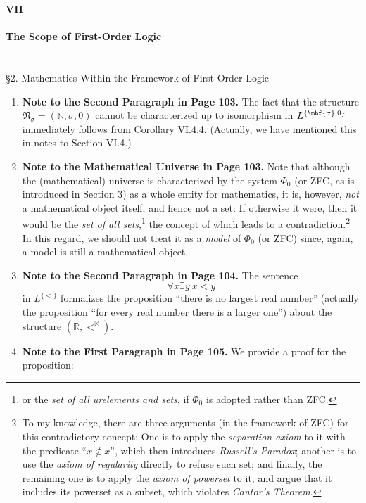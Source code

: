 {\LARGE \bfseries VII \\ \\ The Scope of First-Order Logic}
\\
\\
\\
{\large \S2. Mathematics Within the Framework of First-Order Logic}
\begin{enumerate}[1.]
\item \textbf{Note to the Second Paragraph in Page 103.} The fact that the structure $\mathfrak{N}_\sigma = (\mathbb{N}, \sigma, 0)$ cannot be characterized up to isomorphism in $L^{\{ \mbf{\sigma}, 0 \}}$ immediately follows from Corollary VI.4.4. (Actually, we have mentioned this in notes to Section VI.4.)
%
\item \textbf{Note to the Mathematical Universe in Page 103.} Note that although the (mathematical) universe is characterized by the system $\Phi_0$ (or ZFC, as is introduced in Section 3) as a whole entity for mathematics, it is, however, \emph{not} a mathematical object itself, and hence not a set: If otherwise it were, then it would be the \emph{set of all sets},\footnote{or the \emph{set of all urelements and sets}, if $\Phi_0$ is adopted rather than ZFC.} the concept of which leads to a contradiction.\footnote{To my knowledge, there are three arguments (in the framework of ZFC) for this contradictory concept: One is to apply the \emph{separation axiom} to it with the predicate ``$x \not \in x$'', which then introduces \emph{Russell's Paradox}; another is to use the \emph{axiom of regularity} directly to refuse such set; and finally, the remaining one is to apply the \emph{axiom of powerset} to it, and argue that it includes its powerset as a subset, which violates \emph{Cantor's Theorem}.}\newline
\ \\
In this regard, we should not treat it as a \emph{model} of $\Phi_0$ (or ZFC) since, again, a model is still a mathematical object.
%
\item \textbf{Note to the Second Paragraph in Page 104.} The sentence
\[
\forall x \exists y \ x < y
\]
in $L^{\{ < \}}$ formalizes the proposition ``there is no largest real number'' (actually the proposition ``for every real number there is a larger one'') about the structure $(\mathbb{R}, <^\mathbb{R})$.
%
\item \textbf{Note to the First Paragraph in Page 105.} We provide a proof for the proposition:

\end{enumerate}
